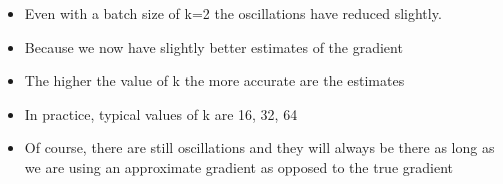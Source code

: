 \begin{frame}
	\begin{columns}
		\begin{overlayarea}{\textwidth}{\textheight}
			\begin{itemize}\justifying
				\item<20-> Even with a batch size of k=2 the oscillations have reduced slightly. \onslide<21->{Why ?} 
				\item<22-> Because we now have slightly better estimates of the gradient \onslide<23->{[analogy: we are now tossing the coin k=2 times to estimate P(heads)]}
				\item<24-> The higher the value of k the more accurate are the estimates 
				\item<25-> In practice, typical values of k are 16, 32, 64
				\item<26-> Of course, there are still oscillations and they will always be there as long as we are using an approximate gradient as opposed to the true gradient
			\end{itemize}
		\end{overlayarea}
		

\end{columns}
\end{frame}
